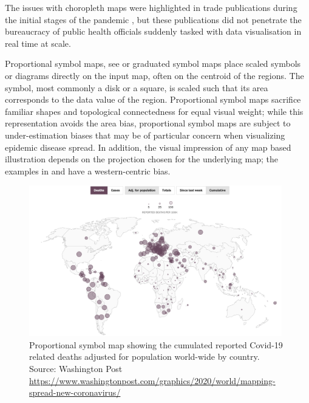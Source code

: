 \documentclass[article]{jdssv}\usepackage[]{graphicx}\usepackage[]{xcolor}
\begin{document}
The issues with choropleth maps were highlighted in trade publications during the initial stages of the pandemic \citep{fieldMappingCoronavirusResponsibly}, but these publications did not penetrate the bureaucracy of public health officials suddenly tasked with data visualisation in real time at scale. 

Proportional symbol maps, see  or graduated symbol maps place scaled symbols or diagrams directly on the input map, often on the centroid of the regions. 
The symbol, most commonly a disk or a square, is scaled such that its area corresponds to the data value of the region. 
Proportional symbol maps sacrifice familiar shapes and topological connectedness for equal visual weight\citep{gaoUsabilityValuebyalphaMaps2019}; while this representation avoids the area bias, proportional symbol maps are subject to under-estimation biases \citep{shimAnalysisMiddleSchool2008} that may be of particular concern when visualizing epidemic disease spread.
In addition, the visual impression of any map based illustration depends on the projection chosen for the underlying map; the examples in  and  have a western-centric bias.


\begin{figure}
	\includegraphics[width = 0.98\textwidth]{Figures_Web/wp_totaldeaths_propsymb.png}
	\caption{Proportional symbol map showing the cumulated reported Covid-19 related deaths adjusted for population world-wide by country. Source: Washington Post \url{https://www.washingtonpost.com/graphics/2020/world/mapping-spread-new-coronavirus/}}
	\label{fig:propsymb}
\end{figure}
\end{document}
